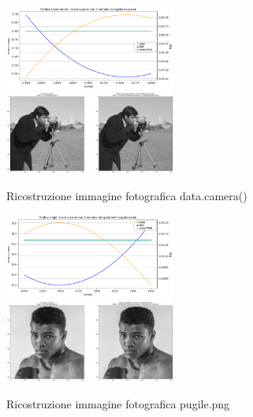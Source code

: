 \begin{figure}[H]
    \includegraphics[width=0.5\textwidth]{IMMAGINI_RELAZIONE/graficoCameramanTik.png}
    \includegraphics[width=0.5\textwidth]{IMMAGINI_RELAZIONE/ricostruzioneCameramanTik.png}
    \caption{Ricostruzione immagine fotografica data.camera()}

    \includegraphics[width=0.5\textwidth]{IMMAGINI_RELAZIONE/graficoPugileTik.png}
    \includegraphics[width=0.5\textwidth]{IMMAGINI_RELAZIONE/ricostruzionePugileTik.png}
    \caption{Ricostruzione immagine fotografica pugile.png}
\end{figure}